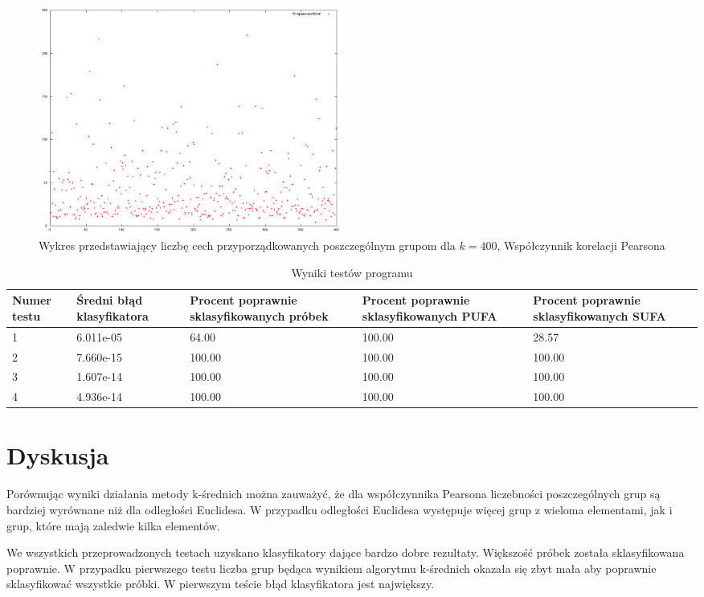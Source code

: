 \documentclass{classrep}
\begin{document}
\begin{figure}
  \centering
  \includegraphics[width=10cm]{img/spearman400.png}
  \caption{Wykres przedstawiający liczbę cech przyporządkowanych poszczególnym
grupom dla $k=400$, Współczynnik korelacji Pearsona}
  \label{spearman.400}
\end{figure}

\begin{table}
\caption{Wyniki testów programu}
\label{testTab1}
\begin{tabular}{|p{1.5cm}|p{2.5cm}|p{2.5cm}|p{2.5cm}|p{2.5cm}|}
 \textbf{Numer testu} & \textbf{Średni błąd klasyfikatora} & \textbf{Procent poprawnie sklasyfikowanych próbek} & \textbf{Procent poprawnie sklasyfikowanych PUFA} & \textbf{Procent poprawnie sklasyfikowanych SUFA} \\ \hline
 1 & 6.011e-05 & 64.00  & 100.00 & 28.57	\\ \hline
 2 & 7.660e-15 & 100.00 & 100.00 & 100.00	\\ \hline
 3 & 1.607e-14 & 100.00 & 100.00 & 100.00 	\\ \hline
 4 & 4.936e-14 & 100.00 & 100.00 & 100.00 	\\ \hline
\end{tabular}
\end{table}

\section{Dyskusja}
Porównując wyniki działania metody k-średnich można zauważyć, że dla współczynnika Pearsona liczebności poszczególnych grup są bardziej wyrównane niż dla odległości Euclidesa. W przypadku odległości Euclidesa występuje więcej grup z wieloma elementami, jak i grup, które mają zaledwie kilka elementów.

We wszystkich przeprowadzonych testach uzyskano klasyfikatory dające bardzo dobre rezultaty. Większość próbek została sklasyfikowana poprawnie. W przypadku pierwszego testu liczba grup będąca wynikiem algorytmu k-średnich okazała się zbyt mała aby poprawnie sklasyfikować wszystkie próbki. W pierwszym teście błąd klasyfikatora jest największy.
\end{document}
